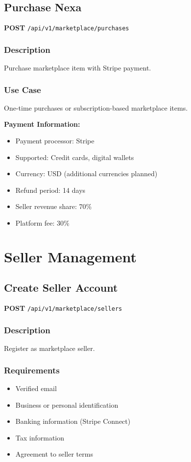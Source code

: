 \documentclass[11pt,a4paper]{report}
\begin{document}
\subsection{Purchase Nexa}

\textbf{POST} \texttt{/api/v1/marketplace/purchases}

\subsubsection{Description}
Purchase marketplace item with Stripe payment.

\subsubsection{Use Case}
One-time purchases or subscription-based marketplace items.

\begin{infobox}
\textbf{Payment Information:}
\begin{itemize}[leftmargin=*]
    \item Payment processor: Stripe
    \item Supported: Credit cards, digital wallets
    \item Currency: USD (additional currencies planned)
    \item Refund period: 14 days
    \item Seller revenue share: 70\%
    \item Platform fee: 30\%
\end{itemize}
\end{infobox}

\section{Seller Management}

\subsection{Create Seller Account}

\textbf{POST} \texttt{/api/v1/marketplace/sellers}

\subsubsection{Description}
Register as marketplace seller.

\subsubsection{Requirements}
\begin{itemize}[leftmargin=*]
    \item Verified email
    \item Business or personal identification
    \item Banking information (Stripe Connect)
    \item Tax information
    \item Agreement to seller terms
\end{itemize}
\end{document}
